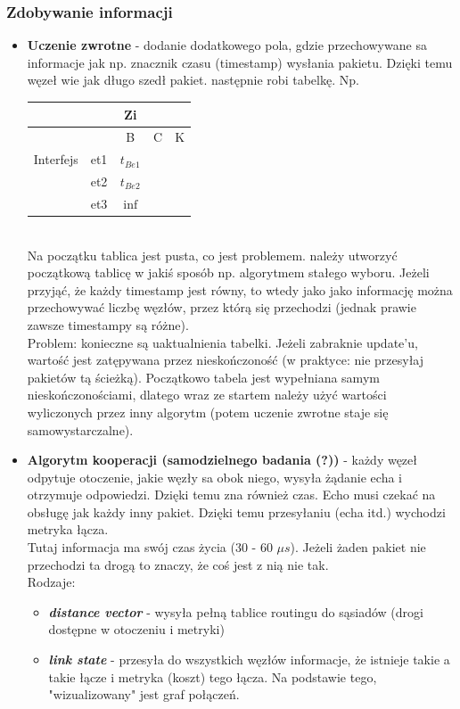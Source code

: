 			\subsubsection{Zdobywanie informacji}
				\begin{itemize}
					\item \textbf{Uczenie zwrotne} - dodanie dodatkowego pola, gdzie przechowywane sa informacje jak np. znacznik czasu (timestamp) wysłania pakietu. Dzięki temu węzeł wie jak długo szedł pakiet. następnie robi tabelkę. Np.\\
					\begin{tabular}{|c|c|c|c|c|}
						\hline  &  & Zi &  &  \\
						\hline  &  & B & C & K \\ 
						\hline Interfejs & et1 & $ t_{Be1} $ &  &  \\ 
						\hline  & et2 & $ t_{Be2} $  & & \\ 
						\hline  & et3 & $ \inf $ &  &  \\ 
						\hline 
					\end{tabular}\\
					Na początku tablica jest pusta, co jest problemem. należy utworzyć początkową tablicę w jakiś sposób np. algorytmem stałego wyboru. Jeżeli przyjąć, że każdy timestamp jest równy, to wtedy jako jako informację można przechowywać liczbę węzłów, przez którą się przechodzi (jednak prawie zawsze timestampy są różne). \\
					Problem: konieczne są uaktualnienia tabelki. Jeżeli zabraknie update'u, wartość jest zatępywana przez nieskończoność (w praktyce: nie przesyłaj pakietów tą ścieżką). Początkowo tabela jest wypełniana samym nieskończonościami, dlatego wraz ze startem należy użyć wartości wyliczonych przez inny algorytm (potem uczenie zwrotne staje się samowystarczalne).
					\item \textbf{Algorytm kooperacji (samodzielnego badania (?))} - każdy węzeł odpytuje otoczenie, jakie węzły sa obok niego, wysyła żądanie echa i otrzymuje odpowiedzi. Dzięki temu zna również czas. Echo musi czekać na obsługę jak każdy inny pakiet. Dzięki temu przesyłaniu (echa itd.) wychodzi metryka łącza.\\
					Tutaj informacja ma swój czas życia (30 - 60 $ \mu s $). Jeżeli żaden pakiet nie przechodzi ta drogą to znaczy, że coś jest z nią nie tak.\\
					Rodzaje:
					\begin{itemize}
						\item \textbf{\emph{distance vector}} - wysyła pełną tablice routingu do sąsiadów (drogi dostępne w otoczeniu i metryki)
						\item \textbf{\emph{link state}} - przesyła do wszystkich węzłów informacje, że istnieje takie a takie łącze i metryka (koszt) tego łącza. Na podstawie tego, "wizualizowany" jest graf połączeń.
					\end{itemize}
				\end{itemize}
